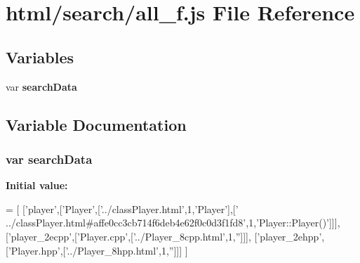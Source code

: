 \section{html/search/all\-\_\-f.js File Reference}
\label{all__f_8js}
\subsection*{Variables}
\begin{DoxyCompactItemize}
\item 
var {\bf search\-Data}
\end{DoxyCompactItemize}


\subsection{Variable Documentation}
\subsubsection[{search\-Data}]{\setlength{\rightskip}{0pt plus 5cm}var search\-Data}\label{all__f_8js_ad01a7523f103d6242ef9b0451861231e}
{\bfseries Initial value\-:}
\begin{DoxyCode}
=
[
  [\textcolor{stringliteral}{'player'},[\textcolor{stringliteral}{'Player'},[\textcolor{stringliteral}{'../classPlayer.html'},1,\textcolor{stringliteral}{'Player'}],[\textcolor{stringliteral}{'
      ../classPlayer.html#affe0cc3cb714f6deb4e62f0c0d3f1fd8'},1,\textcolor{stringliteral}{'Player::Player()'}]]],
  [\textcolor{stringliteral}{'player\_2ecpp'},[\textcolor{stringliteral}{'Player.cpp'},[\textcolor{stringliteral}{'../Player\_8cpp.html'},1,\textcolor{stringliteral}{''}]]],
  [\textcolor{stringliteral}{'player\_2ehpp'},[\textcolor{stringliteral}{'Player.hpp'},[\textcolor{stringliteral}{'../Player\_8hpp.html'},1,\textcolor{stringliteral}{''}]]]
]
\end{DoxyCode}
